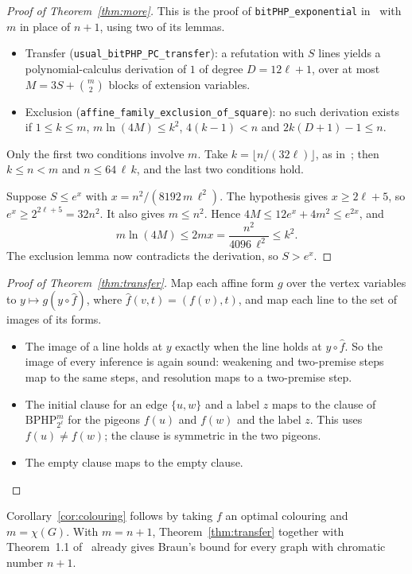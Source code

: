 \documentclass[11pt]{article}
\theoremstyle{remark}
\newcommand{\BPHP}{\mathrm{BPHP}}
\begin{document}
\begin{proof}[Proof of Theorem~\ref{thm:more}]
This is the proof of \texttt{bitPHP\_exponential} in~\cite{Br26} with $m$ in
place of $n+1$, using two of its lemmas.
\begin{itemize}
\item Transfer (\texttt{usual\_bitPHP\_PC\_transfer}): a refutation with $S$
lines yields a polynomial-calculus derivation of $1$ of degree $D=12\ell+1$,
over at most $M=3S+\binom m2$ blocks of extension variables.
\item Exclusion (\texttt{affine\_family\_exclusion\_of\_square}): no such
derivation exists if $1\le k\le m$, $m\ln(4M)\le k^2$, $4(k-1)<n$ and
$2k(D+1)-1\le n$.
\end{itemize}
Only the first two conditions involve $m$. Take $k=\lfloor n/(32\ell)\rfloor$,
as in~\cite{Br26}; then $k\le n<m$ and $n\le 64\,\ell\,k$, and the last two
conditions hold.

Suppose $S\le e^x$ with $x=n^2/(8192\,m\,\ell^2)$. The hypothesis gives
$x\ge2\ell+5$, so $e^x\ge 2^{2\ell+5}=32n^2$. It also gives $m\le n^2$. Hence
$4M\le 12e^x+4m^2\le e^{2x}$, and
\[
 m\ln(4M)\le 2mx=\frac{n^2}{4096\,\ell^2}\le k^2 .
\]
The exclusion lemma now contradicts the derivation, so $S>e^x$.
\end{proof}

\begin{proof}[Proof of Theorem~\ref{thm:transfer}]
Map each affine form $g$ over the vertex variables to $y\mapsto g(y\circ\hat
f)$, where $\hat f(v,t)=(f(v),t)$, and map each line to the set of images of
its forms.
\begin{itemize}
\item The image of a line holds at $y$ exactly when the line holds at
$y\circ\hat f$. So the image of every inference is again sound: weakening and
two-premise steps map to the same steps, and resolution maps to a two-premise
step.
\item The initial clause for an edge $\{u,w\}$ and a label $z$ maps to the
clause of $\BPHP^m_{2^\ell}$ for the pigeons $f(u)$ and $f(w)$ and the label
$z$. This uses $f(u)\ne f(w)$; the clause is symmetric in the two pigeons.
\item The empty clause maps to the empty clause.\qedhere
\end{itemize}
\end{proof}

Corollary~\ref{cor:colouring} follows by taking $f$ an optimal colouring and
$m=\chi(G)$. With $m=n+1$, Theorem~\ref{thm:transfer} together with Theorem~1.1
of~\cite{Br26} already gives Braun's bound for every graph with chromatic
number $n+1$.
\end{document}
